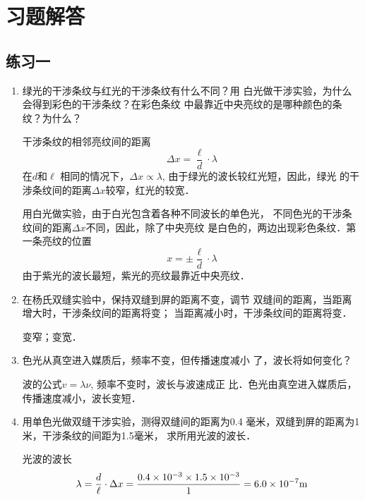 \section{习题解答}
\subsection{练习一}

\begin{enumerate}
\item 绿光的干涉条纹与红光的干涉条纹有什么不同？用
白光做干涉实验，为什么会得到彩色的干涉条纹？在彩色条纹
中最靠近中央亮纹的是哪种颜色的条纹？为什么？


\begin{solution}
干涉条纹的相邻亮纹间的距离
\[\Delta x=\frac{\ell}{d}\cdot \lambda\]
在$d$和$\ell$
相同的情况下，$\Delta x\propto \lambda$, 由于绿光的波长较红光短，因此，绿光
的干涉条纹间的距离$\Delta x$较窄，红光的较宽．

用白光做实验，由于白光包含着各种不同波长的单色光，
不同色光的干涉条纹间的距离$\Delta x$不同，因此，除了中央亮纹
是白色的，两边出现彩色条纹．第一条亮纹的位置
\[x=\pm\frac{\ell}{d}\cdot \lambda\]
由于紫光的波长最短，紫光的亮纹最靠近中央亮纹．
\end{solution}

\item 在杨氏双缝实验中，保持双缝到屏的距离不变，调节
双缝间的距离，当距离增大时，干涉条纹间的距离将变\underline{\qquad}；
当距离减小时，干涉条纹间的距离将变\underline{\qquad}．


\begin{solution}
    变窄；变宽．
\end{solution}

\item 色光从真空进入媒质后，频率不变，但传播速度减小
了，波长将如何变化？


\begin{solution}
    波的公式$v=\lambda\nu$, 频率不变时，波长与波速成正
    比．色光由真空进入媒质后，传播速度减小，波长变短．
\end{solution}

\item 用单色光做双缝干涉实验，测得双缝间的距离为0.4
毫米，双缝到屏的距离为1米，干涉条纹的间距为1.5毫米，
求所用光波的波长．


\begin{solution}
    光波的波长
\[\lambda=\frac{d}{\ell}\cdot \Delta x=\frac{0.4\times 10^{-3}\times 1.5\times 10^{-3}}{1}=6.0\times 10^{-7}{\rm m}\]
\end{solution}


\end{enumerate}
